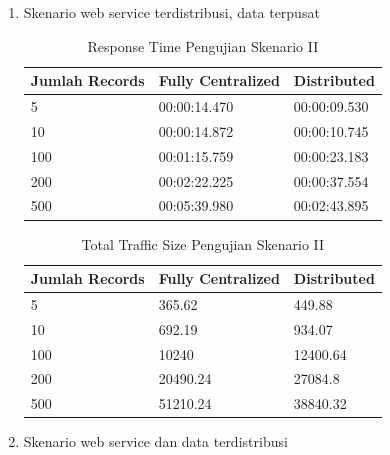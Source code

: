 \begin{enumerate}
\item Skenario web service terdistribusi, data terpusat

\begin{table}[H]
\begin{minipage}{\linewidth}
\centering
\begin{tabular}{|l|l|l|}
\hline
\textbf{Jumlah Records} & \textbf{Fully Centralized} & \textbf{Distributed} \\ \hline
5           & 00:00:14.470            & 00:00:09.530                  \\ \hline
10           & 00:00:14.872            & 00:00:10.745                  \\ \hline
100           & 00:01:15.759         & 00:00:23.183                  \\ \hline
200           & 00:02:22.225             & 00:00:37.554                 \\ \hline
500           & 00:05:39.980             & 00:02:43.895                 \\ \hline
\end{tabular}
\caption{Response Time Pengujian Skenario II}
\label{table:testing-2-response-time}
\end{minipage}
\end{table}

\begin{table}[H]
\begin{minipage}{\linewidth}
\centering
\begin{tabular}{|l|l|l|}
\hline
\textbf{Jumlah Records} & \textbf{Fully Centralized} & \textbf{Distributed} \\ \hline
5           & 365.62            & 449.88                  \\ \hline
10           & 692.19            & 934.07                  \\ \hline
100           & 10240         & 12400.64                  \\ \hline
200           & 20490.24             & 27084.8                 \\ \hline
500           & 51210.24             & 38840.32                 \\ \hline
\end{tabular}
\caption{Total Traffic Size Pengujian Skenario II}
\label{table:testing-2-traffic}
\end{minipage}
\end{table}

\item Skenario web service dan data terdistribusi


\end{enumerate}
